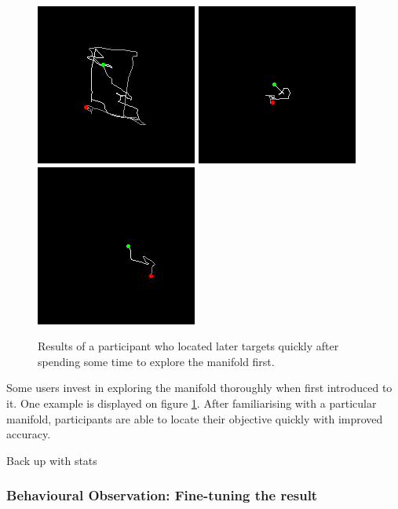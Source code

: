\documentclass[ %
author={Dillon Keith Diep},
supervisor={Dr. Carl Henrik Ek},
degree={MEng},
title={ART-CG:},
subtitle={Assisted Real-time Content Generation of 3D Hair by Learning Manifolds},
type={Research},
year={2017} ]{dissertation}
\begin{document}
\begin{figure}[!h]
	\centering
	\caption{Results of a participant who located later targets quickly after spending some time to explore the manifold first.}
	\includegraphics[scale=0.6]{images/experiment/Andrei_ONE_REPLOT}
	\includegraphics[scale=0.6]{images/experiment/Andrei_TWO_REPLOT}
	\includegraphics[scale=0.6]{images/experiment/Andrei_THREE_REPLOT}
	\label{andreiresult}
\end{figure}

Some users invest in exploring the manifold thoroughly when first introduced to it. One example is displayed on figure \ref{andreiresult}. After familiarising with a particular manifold, participants are able to locate their objective quickly with improved accuracy.

{\color{red} Back up with stats }

\subsubsection{Behavioural Observation: Fine-tuning the result}
\end{document}
